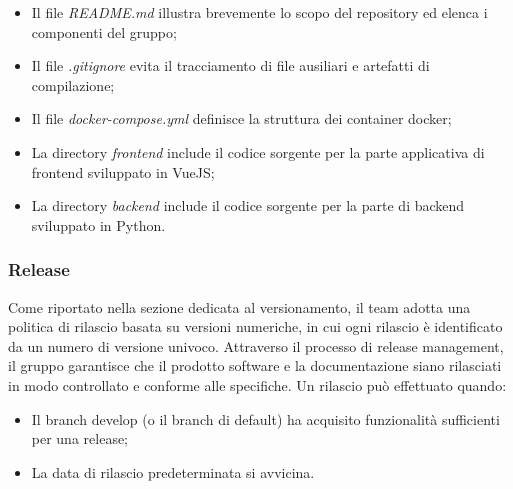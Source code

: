 \begin{itemize}
  \item Il file \emph{README.md} illustra brevemente lo scopo del repository ed elenca i componenti del gruppo;
  \item Il file \emph{.gitignore} evita il tracciamento di file ausiliari e artefatti di compilazione;
  \item Il file \emph{docker-compose.yml} definisce la struttura dei container docker;
  \item La directory \emph{frontend} include il codice sorgente per la parte applicativa di frontend sviluppato in VueJS;
  \item La directory \emph{backend} include il codice sorgente per la parte di backend sviluppato in Python.
\end{itemize}

\subsubsection{Release}
\par Come riportato nella sezione dedicata al versionamento, il team adotta una politica di rilascio basata su versioni numeriche, in cui ogni rilascio è identificato da un numero di versione univoco. Attraverso il processo di release management, il gruppo garantisce che il prodotto software e la documentazione siano rilasciati in modo controllato e conforme alle specifiche. Un rilascio può effettuato quando:
\begin{itemize}
  \item Il branch develop (o il branch di default) ha acquisito funzionalità sufficienti per una release;
  \item La data di rilascio predeterminata si avvicina.
\end{itemize}

